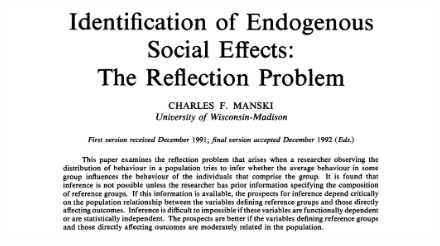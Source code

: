 \documentclass[aspectratio=169]{beamer}
\theoremstyle{remark}
\begin{document}
\begin{frame}
    \vspace{5mm}
    \begin{figure}
        \centering
        \includegraphics[width=\textwidth]{figures/manski1993.png}
    \end{figure}
\end{frame}
\end{document}

